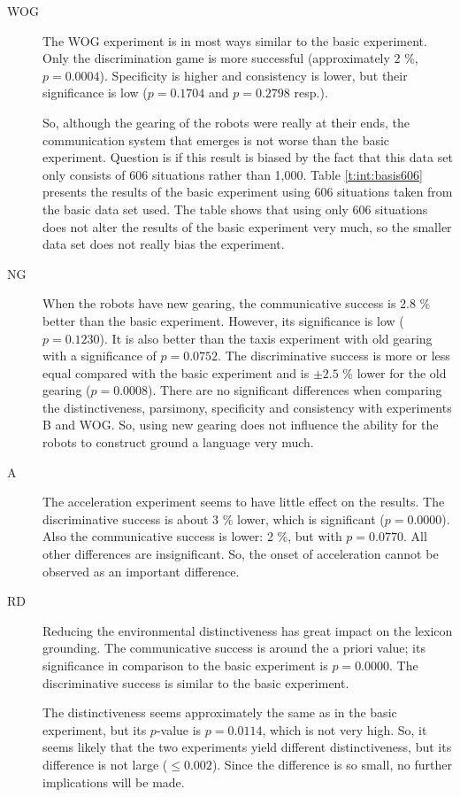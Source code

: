 \begin{description}
\item[WOG] The WOG experiment is in most ways similar to the basic experiment. Only the discrimination game is more successful (approximately 2 \%, $p=0.0004$). Specificity is higher and consistency is lower, but their significance is low ($p=0.1704$ and $p=0.2798$ resp.).

So, although the gearing of the robots were really at their ends, the communication system that emerges is not worse than the basic experiment. Question is if this result is biased by the fact that this data set only consists of 606 situations rather than 1,000. Table \ref{t:int:basis606} presents the results of the basic experiment using 606 situations taken from the basic data set used. The table shows that using only 606 situations does not alter the results of the basic experiment very much, so the smaller data set does not really bias the experiment. 

\item[NG] When the robots have new gearing, the communicative success is 2.8 \%  better than the basic experiment. However, its significance is low ($p=0.1230$). It is also better than the taxis experiment with old gearing with a significance of $p=0.0752$. The discriminative success is more or less equal compared with the basic experiment and is $\pm 2.5$ \% lower for the old gearing ($p=0.0008$). There are no significant differences when comparing the distinctiveness, parsimony, specificity and consistency with experiments B and WOG. So, using new gearing does not influence the ability for the robots to construct ground a language very much. 

\item[A] The acceleration experiment  seems to have little effect on the results. The discriminative success is about 3 \% lower, which is significant ($p=0.0000$). Also the communicative success is lower: 2 \%, but with $p=0.0770$. All other differences are insignificant. So, the onset of acceleration cannot be observed as an important difference.

\item[RD] Reducing the environmental distinctiveness has great impact on the lexicon grounding. The communicative success is around the a priori value; its significance in comparison to the basic experiment is $p=0.0000$. The discriminative success is similar to the basic experiment. 

The distinctiveness seems approximately the same as in the basic experiment, but its $p$-value is $p=0.0114$, which is not very high. So, it seems likely that the two experiments yield different distinctiveness, but its difference is not large ($\leq 0.002$). Since the difference is so small, no further implications will be made.


\end{description}
